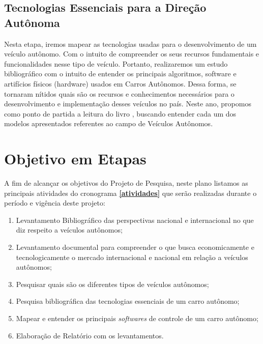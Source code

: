 \section{Tecnologias Essenciais para a Direção Autônoma}
Nesta etapa, iremos mapear as tecnologias usadas para o desenvolvimento de um veículo autônomo. Com o intuito de compreender os seus recursos fundamentais e funcionalidades nesse tipo de veículo.  Portanto, realizaremos um estudo bibliográfico com o intuito de entender os principais algoritmos, software e artifícios físicos (hardware) usados em Carros Autônomos. Dessa forma, se tornaram nítidos quais são os recursos e conhecimentos necessários para o desenvolvimento e implementação desses veículos no país. Neste ano, propomos como ponto de partida a leitura do livro \cite{aurelien2017hands}, buscando entender cada um dos modelos apresentados referentes ao campo de Veículos Autônomos.

\chapter{Objetivo em Etapas} \label{chap:etapas}
A fim de alcançar os objetivos do Projeto de Pesquisa, neste plano listamos as principais atividades do cronograma \textbf{\ref{atividades}} que serão realizadas durante o período e vigência deste projeto:

\begin{enumerate}
  \item  Levantamento Bibliográfico das perspectivas nacional e internacional no que diz respeito a veículos autônomos;
  \item  Levantamento documental para compreender o que busca economicamente e tecnologicamente o mercado internacional e nacional em relação a veículos autônomos;
  \item Pesquisar quais são os diferentes tipos de veículos autônomos;
  \item Pesquisa bibliográfica das tecnologias essenciais de um carro autônomo;
  \item Mapear e entender os principais \textit{softwares} de controle de um carro autônomo;
  \item Elaboração de Relatório com os levantamentos.
\end{enumerate}
